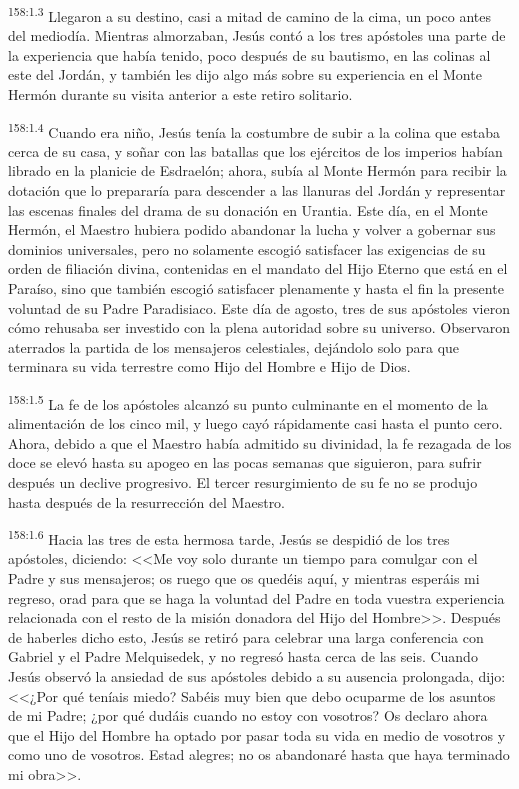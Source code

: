 \par 
\textsuperscript{158:1.3} Llegaron a su destino, casi a mitad de camino de la cima, un poco antes del mediodía. Mientras almorzaban, Jesús contó a los tres apóstoles una parte de la experiencia que había tenido, poco después de su bautismo, en las colinas al este del Jordán, y también les dijo algo más sobre su experiencia en el Monte Hermón durante su visita anterior a este retiro solitario.

\par 
\textsuperscript{158:1.4} Cuando era niño, Jesús tenía la costumbre de subir a la colina que estaba cerca de su casa, y soñar con las batallas que los ejércitos de los imperios habían librado en la planicie de Esdraelón; ahora, subía al Monte Hermón para recibir la dotación que lo prepararía para descender a las llanuras del Jordán y representar las escenas finales del drama de su donación en Urantia. Este día, en el Monte Hermón, el Maestro hubiera podido abandonar la lucha y volver a gobernar sus dominios universales, pero no solamente escogió satisfacer las exigencias de su orden de filiación divina, contenidas en el mandato del Hijo Eterno que está en el Paraíso, sino que también escogió satisfacer plenamente y hasta el fin la presente voluntad de su Padre Paradisiaco. Este día de agosto, tres de sus apóstoles vieron cómo rehusaba ser investido con la plena autoridad sobre su universo. Observaron aterrados la partida de los mensajeros celestiales, dejándolo solo para que terminara su vida terrestre como Hijo del Hombre e Hijo de Dios.

\par 
\textsuperscript{158:1.5} La fe de los apóstoles alcanzó su punto culminante en el momento de la alimentación de los cinco mil, y luego cayó rápidamente casi hasta el punto cero. Ahora, debido a que el Maestro había admitido su divinidad, la fe rezagada de los doce se elevó hasta su apogeo en las pocas semanas que siguieron, para sufrir después un declive progresivo. El tercer resurgimiento de su fe no se produjo hasta después de la resurrección del Maestro.

\par 
\textsuperscript{158:1.6} Hacia las tres de esta hermosa tarde, Jesús se despidió de los tres apóstoles, diciendo: <<Me voy solo durante un tiempo para comulgar con el Padre y sus mensajeros; os ruego que os quedéis aquí, y mientras esperáis mi regreso, orad para que se haga la voluntad del Padre en toda vuestra experiencia relacionada con el resto de la misión donadora del Hijo del Hombre>>. Después de haberles dicho esto, Jesús se retiró para celebrar una larga conferencia con Gabriel y el Padre Melquisedek, y no regresó hasta cerca de las seis. Cuando Jesús observó la ansiedad de sus apóstoles debido a su ausencia prolongada, dijo: <<¿Por qué teníais miedo? Sabéis muy bien que debo ocuparme de los asuntos de mi Padre; ¿por qué dudáis cuando no estoy con vosotros? Os declaro ahora que el Hijo del Hombre ha optado por pasar toda su vida en medio de vosotros y como uno de vosotros. Estad alegres; no os abandonaré hasta que haya terminado mi obra>>.

